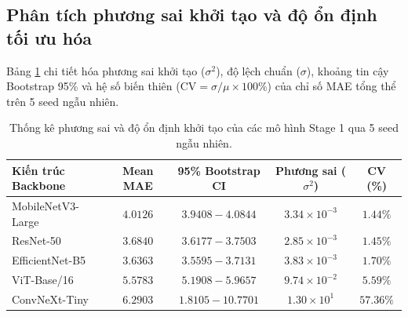 \subsection{Phân tích phương sai khởi tạo và độ ổn định tối ưu hóa}
Bảng \ref{tab:stage1_seed_variance} chi tiết hóa phương sai khởi tạo ($\sigma^2$), độ lệch chuẩn ($\sigma$), khoảng tin cậy Bootstrap 95\% và hệ số biến thiên ($\text{CV} = \sigma / \mu \times 100\%$) của chỉ số MAE tổng thể trên 5 seed ngẫu nhiên.

\begin{table}[htbp]
\centering
\caption{Thống kê phương sai và độ ổn định khởi tạo của các mô hình Stage 1 qua 5 seed ngẫu nhiên.}
\label{tab:stage1_seed_variance}
\small
\begin{tabular}{lcccc}
\toprule
\textbf{Kiến trúc Backbone} & \textbf{Mean MAE} & \textbf{95\% Bootstrap CI} & \textbf{Phương sai ($\sigma^2$)} & \textbf{CV (\%)} \\
\midrule
MobileNetV3-Large \cite{mobilenet} & $4.0126$ & $3.9408 - 4.0844$ & $3.34 \times 10^{-3}$ & $\mathbf{1.44\%}$ \\
ResNet-50 \cite{resnet} & $3.6840$ & $3.6177 - 3.7503$ & $2.85 \times 10^{-3}$ & $1.45\%$ \\
EfficientNet-B5 \cite{efficientnet} & $\mathbf{3.6363}$ & $\mathbf{3.5595 - 3.7131}$ & $3.83 \times 10^{-3}$ & $1.70\%$ \\
ViT-Base/16 \cite{vit} & $5.5783$ & $5.1908 - 5.9657$ & $9.74 \times 10^{-2}$ & $5.59\%$ \\
ConvNeXt-Tiny \cite{convnext} & $6.2903$ & $1.8105 - 10.7701$ & $1.30 \times 10^{1}$ & $57.36\%$ \\
\bottomrule
\end{tabular}
\end{table}

